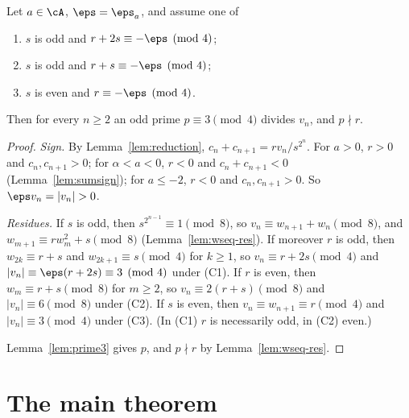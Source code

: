 \begin{lemma}
  \label{lem:twoadic}
  \leanok
  Let $a \in \cA$, $\eps = \eps_a$, and assume one of
  \begin{enumerate}
    \item[(C1)] $s$ is odd and $r + 2s \equiv -\eps \pmod 4$;
    \item[(C2)] $s$ is odd and $r + s \equiv -\eps \pmod 4$;
    \item[(C3)] $s$ is even and $r \equiv -\eps \pmod 4$.
  \end{enumerate}
  Then for every $n \ge 2$ an odd prime $p \equiv 3 \pmod 4$ divides $v_n$, and $p \nmid r$.
\end{lemma}
\begin{proof}
  \leanok
  \emph{Sign.} By Lemma~\ref{lem:reduction}, $c_n + c_{n+1} = r v_n / s^{2^n}$. For $a > 0$, $r > 0$ and
  $c_n, c_{n+1} > 0$; for $\alpha < a < 0$, $r < 0$ and $c_n + c_{n+1} < 0$
  (Lemma~\ref{lem:sumsign}); for $a \le -2$, $r < 0$ and $c_n, c_{n+1} > 0$. So $\eps v_n = |v_n| > 0$.

  \emph{Residues.} If $s$ is odd, then $s^{2^{n-1}} \equiv 1 \pmod 8$, so
  $v_n \equiv w_{n+1} + w_n \pmod 8$, and $w_{m+1} \equiv r w_m^2 + s \pmod 8$
  (Lemma~\ref{lem:wseq-res}). If moreover $r$ is odd, then $w_{2k} \equiv r + s$ and
  $w_{2k+1} \equiv s \pmod 4$ for $k \ge 1$, so $v_n \equiv r + 2s \pmod 4$ and
  $|v_n| \equiv \eps(r + 2s) \equiv 3 \pmod 4$ under (C1). If $r$ is even, then
  $w_m \equiv r + s \pmod 8$ for $m \ge 2$, so $v_n \equiv 2(r + s) \pmod 8$ and
  $|v_n| \equiv 6 \pmod 8$ under (C2). If $s$ is even, then $v_n \equiv w_{n+1} \equiv r \pmod 4$ and
  $|v_n| \equiv 3 \pmod 4$ under (C3). (In (C1) $r$ is necessarily odd, in (C2) even.)

  Lemma~\ref{lem:prime3} gives $p$, and $p \nmid r$ by Lemma~\ref{lem:wseq-res}.
\end{proof}

\section{The main theorem}

